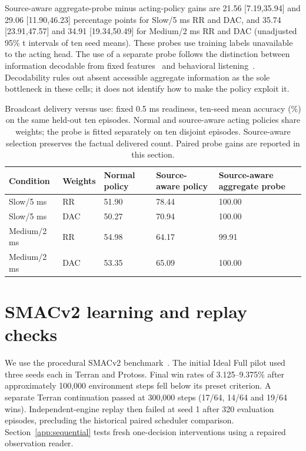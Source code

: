\documentclass[pdflatex,sn-mathphys-num]{sn-jnl}
\begin{document}
Source-aware aggregate-probe minus acting-policy gains are 21.56 [7.19,35.94] and 29.06 [11.90,46.23] percentage points for Slow/5 ms RR and DAC, and 35.74 [23.91,47.57] and 34.91 [19.34,50.49] for Medium/2 ms RR and DAC (unadjusted 95\% t intervals of ten seed means). These probes use training labels unavailable to the acting head. The use of a separate probe follows the distinction between information decodable from fixed features~\citep{alain2016understanding} and behavioral listening~\citep{lowe2019pitfalls}. Decodability rules out absent accessible aggregate information as the sole bottleneck in these cells; it does not identify how to make the policy exploit it.
\begin{table}[htbp]\centering\normalsize
\caption{Broadcast delivery versus use: fixed 0.5 ms readiness, ten-seed mean accuracy (\%) on the same held-out ten episodes. Normal and source-aware acting policies share weights; the probe is fitted separately on ten disjoint episodes. Source-aware selection preserves the factual delivered count. Paired probe gains are reported in this section.}\label{tab:broadcast_use}
\vspace{3mm}
{\footnotesize\setlength{\tabcolsep}{1.3pt}\begin{tabular}{lllll}\toprule
Condition & Weights & Normal policy & Source-aware policy & Source-aware aggregate probe\\\midrule
Slow/5 ms & RR & 51.90 & 78.44 & 100.00\\
Slow/5 ms & DAC & 50.27 & 70.94 & 100.00\\
Medium/2 ms & RR & 54.98 & 64.17 & 99.91\\
Medium/2 ms & DAC & 53.35 & 65.09 & 100.00\\
\bottomrule\end{tabular}}\end{table}
\FloatBarrier
\section{SMACv2 learning and replay checks}\label{app:smac_replay}
We use the procedural SMACv2 benchmark~\citep{ellis2023smacv2}. The initial Ideal Full pilot used three seeds each in Terran and Protoss. Final win rates of 3.125--9.375\% after approximately 100,000 environment steps fell below its preset criterion. A separate Terran continuation passed at 300,000 steps (17/64, 14/64 and 19/64 wins). Independent-engine replay then failed at seed 1 after 320 evaluation episodes, precluding the historical paired scheduler comparison. Section~\ref{app:sequential} tests fresh one-decision interventions using a repaired observation reader.
\end{document}
